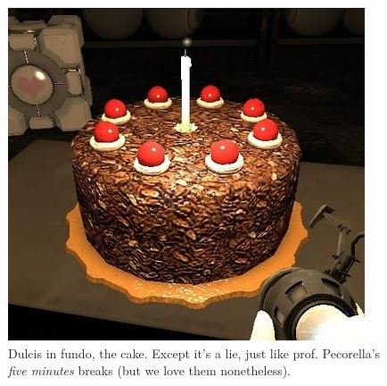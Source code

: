 \begin{figure}[h]
    \centering
    \includegraphics[scale=0.8]{img/portal_cake_meme.jpg}
    \decoRule
    \caption{Dulcis in fundo, the cake. Except it's a lie, just like prof. Pecorella’s \textit{five minutes} breaks (but we love them nonetheless).}
    \label{fig:portal_cake_break}
\end{figure}